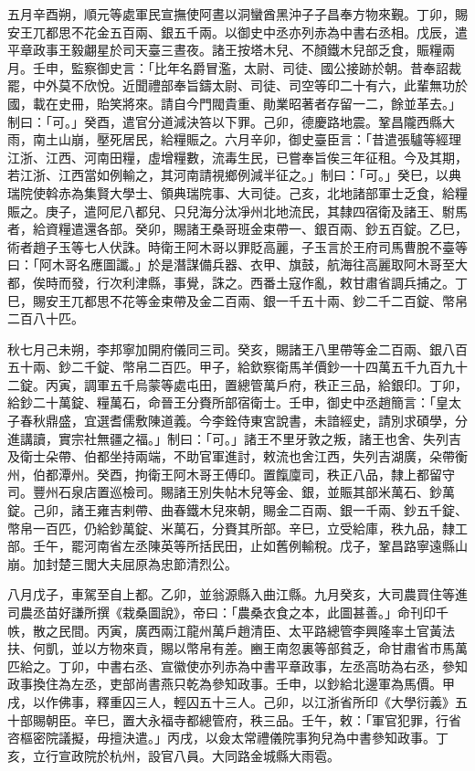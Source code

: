 \begin{pinyinscope}
 五月辛酉朔，順元等處軍民宣撫使阿晝以洞蠻酋黑沖子子昌奉方物來覲。丁卯，賜安王兀都思不花金五百兩、銀五千兩。以御史中丞亦列赤為中書右丞相。戊辰，遣平章政事王毅翽星於司天臺三晝夜。諸王按塔木兒、不顏鐵木兒部乏食，賑糧兩月。壬申，監察御史言：「比年名爵冒濫，太尉、司徒、國公接跡於朝。昔奉詔裁罷，中外莫不欣悅。近聞禮部奉旨鑄太尉、司徒、司空等印二十有六，此輩無功於國，載在史冊，貽笑將來。請自今門閥貴重、勛業昭著者存留一二，餘並革去。」制曰：「可。」癸酉，遣官分道減決笞以下罪。己卯，德慶路地震。鞏昌隴西縣大雨，南土山崩，壓死居民，給糧賑之。六月辛卯，御史臺臣言：「昔遣張驢等經理江浙、江西、河南田糧，虛增糧數，流毒生民，已嘗奉旨俟三年征租。今及其期，若江浙、江西當如例輸之，其河南請視鄉例減半征之。」制曰：「可。」癸巳，以典瑞院使斡赤為集賢大學士、領典瑞院事、大司徒。己亥，北地諸部軍士乏食，給糧賑之。庚子，遣阿尼八都兒、只兒海分汰凈州北地流民，其隸四宿衛及諸王、駙馬者，給資糧遣還各部。癸卯，賜諸王桑哥班金束帶一、銀百兩、鈔五百錠。乙巳，術者趙子玉等七人伏誅。時衛王阿木哥以罪貶高麗，子玉言於王府司馬曹脫不臺等曰：「阿木哥名應圖讖。」於是潛謀備兵器、衣甲、旗鼓，航海往高麗取阿木哥至大都，俟時而發，行次利津縣，事覺，誅之。西番土寇作亂，敕甘肅省調兵捕之。丁巳，賜安王兀都思不花等金束帶及金二百兩、銀一千五十兩、鈔二千二百錠、幣帛二百八十匹。



 秋七月己未朔，李邦寧加開府儀同三司。癸亥，賜諸王八里帶等金二百兩、銀八百五十兩、鈔二千錠、幣帛二百匹。甲子，給欽察衛馬羊價鈔一十四萬五千九百九十二錠。丙寅，調軍五千烏蒙等處屯田，置總管萬戶府，秩正三品，給銀印。丁卯，給鈔二十萬錠、糧萬石，命晉王分賚所部宿衛士。壬申，御史中丞趙簡言：「皇太子春秋鼎盛，宜選耆儒敷陳道義。今李銓侍東宮說書，未諳經史，請別求碩學，分進講讀，實宗社無疆之福。」制曰：「可。」諸王不里牙敦之叛，諸王也舍、失列吉及衛士朵帶、伯都坐持兩端，不助官軍進討，敕流也舍江西，失列吉湖廣，朵帶衡州，伯都潭州。癸酉，拘衛王阿木哥王傅印。置餼廩司，秩正八品，隸上都留守司。豐州石泉店置巡檢司。賜諸王別失帖木兒等金、銀，並賑其部米萬石、鈔萬錠。己卯，諸王雍吉剌帶、曲春鐵木兒來朝，賜金二百兩、銀一千兩、鈔五千錠、幣帛一百匹，仍給鈔萬錠、米萬石，分賚其所部。辛巳，立受給庫，秩九品，隸工部。壬午，罷河南省左丞陳英等所括民田，止如舊例輸稅。戊子，鞏昌路寧遠縣山崩。加封楚三閭大夫屈原為忠節清烈公。



 八月戊子，車駕至自上都。乙卯，並翁源縣入曲江縣。九月癸亥，大司農買住等進司農丞苗好謙所撰《栽桑圖說》，帝曰：「農桑衣食之本，此圖甚善。」命刊印千帙，散之民間。丙寅，廣西兩江龍州萬戶趙清臣、太平路總管李興隆率土官黃法扶、何凱，並以方物來貢，賜以幣帛有差。豳王南忽裏等部貧乏，命甘肅省市馬萬匹給之。丁卯，中書右丞、宣徽使亦列赤為中書平章政事，左丞高昉為右丞，參知政事換住為左丞，吏部尚書燕只乾為參知政事。壬申，以鈔給北邊軍為馬價。甲戌，以作佛事，釋重囚三人，輕囚五十三人。己卯，以江浙省所印《大學衍義》五十部賜朝臣。辛巳，置大永福寺都總管府，秩三品。壬午，敕：「軍官犯罪，行省咨樞密院議擬，毋擅決遣。」丙戌，以僉太常禮儀院事狗兒為中書參知政事。丁亥，立行宣政院於杭州，設官八員。大同路金城縣大雨雹。




\end{pinyinscope}
